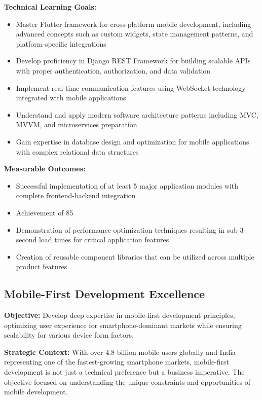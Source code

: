 \textbf{Technical Learning Goals:}
\begin{itemize}
    \item Master Flutter framework for cross-platform mobile development, including advanced concepts such as custom widgets, state management patterns, and platform-specific integrations
    \item Develop proficiency in Django REST Framework for building scalable APIs with proper authentication, authorization, and data validation
    \item Implement real-time communication features using WebSocket technology integrated with mobile applications
    \item Understand and apply modern software architecture patterns including MVC, MVVM, and microservices preparation
    \item Gain expertise in database design and optimization for mobile applications with complex relational data structures
\end{itemize}

\textbf{Measurable Outcomes:}
\begin{itemize}
    \item Successful implementation of at least 5 major application modules with complete frontend-backend integration
    \item Achievement of 85%
    \item Demonstration of performance optimization techniques resulting in sub-3-second load times for critical application features
    \item Creation of reusable component libraries that can be utilized across multiple product features
\end{itemize}

\subsection{Mobile-First Development Excellence}

\textbf{Objective:} Develop deep expertise in mobile-first development principles, optimizing user experience for smartphone-dominant markets while ensuring scalability for various device form factors.

\textbf{Strategic Context:} With over 4.8 billion mobile users globally and India representing one of the fastest-growing smartphone markets, mobile-first development is not just a technical preference but a business imperative. The objective focused on understanding the unique constraints and opportunities of mobile development.


